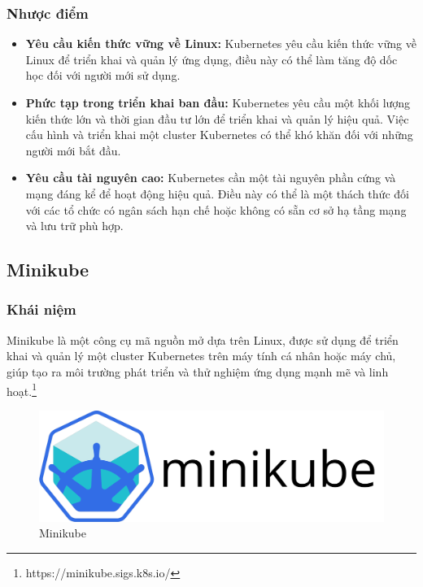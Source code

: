 \subsubsection{Nhược điểm}
\begin{itemize}
  \item \textbf{Yêu cầu kiến thức vững về Linux:} Kubernetes yêu cầu kiến thức vững về Linux để triển khai và quản lý ứng dụng, điều này có thể làm tăng độ dốc học đối với người mới sử dụng.
  \item \textbf{Phức tạp trong triển khai ban đầu:} Kubernetes yêu cầu một khối lượng kiến thức lớn và thời gian đầu tư lớn để triển khai và quản lý hiệu quả. Việc cấu hình và triển khai một cluster Kubernetes có thể khó khăn đối với những người mới bắt đầu.
  \item \textbf{Yêu cầu tài nguyên cao:} Kubernetes cần một tài nguyên phần cứng và mạng đáng kể để hoạt động hiệu quả. Điều này có thể là một thách thức đối với các tổ chức có ngân sách hạn chế hoặc không có sẵn cơ sở hạ tầng mạng và lưu trữ phù hợp.
\end{itemize}
\subsection{Minikube}
\subsubsection{Khái niệm}
\noindent Minikube là một công cụ mã nguồn mở dựa trên Linux, được sử dụng để triển khai và quản lý một cluster Kubernetes trên máy tính cá nhân hoặc máy chủ, giúp tạo ra môi trường phát triển và thử nghiệm ứng dụng mạnh mẽ và linh hoạt.\footnote{https://minikube.sigs.k8s.io/}
\begin{figure}[H]
  \begin{center}
    \includegraphics[scale=0.35]{images/hieu/phuluc/minikube.png}
    \caption{Minikube}
  \end{center}
\end{figure}
